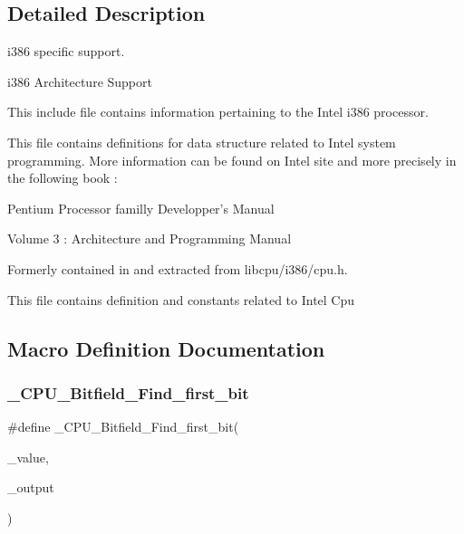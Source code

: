 \subsection{Detailed Description}
i386 specific support. 

i386 Architecture Support

This include file contains information pertaining to the Intel i386 processor.

This file contains definitions for data structure related to Intel system programming. More information can be found on Intel site and more precisely in the following book \+: \begin{DoxyVerb}Pentium Processor familly
Developper's Manual

Volume 3 : Architecture and Programming Manual
\end{DoxyVerb}


Formerly contained in and extracted from libcpu/i386/cpu.\+h.

This file contains definition and constants related to Intel Cpu 

\subsection{Macro Definition Documentation}
\mbox{\label{group__RTEMSScoreCPUi386_gabbc6ee0d13009243d4088dfde2fe5da9}} 
\subsubsection{\texorpdfstring{\_CPU\_Bitfield\_Find\_first\_bit}{\_CPU\_Bitfield\_Find\_first\_bit}}
{\footnotesize\ttfamily \#define \+\_\+\+C\+P\+U\+\_\+\+Bitfield\+\_\+\+Find\+\_\+first\+\_\+bit(\begin{DoxyParamCaption}\item[{}]{\+\_\+value,  }\item[{}]{\+\_\+output }\end{DoxyParamCaption})}

